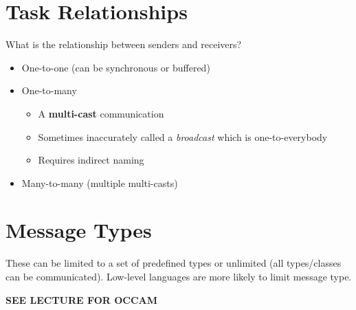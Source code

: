 \documentclass[11pt]{article}
\begin{document}
\section{Task Relationships}
\label{sec:org38d6cf7}
What is the relationship between senders and receivers?
\begin{itemize}
\item One-to-one (can be synchronous or buffered)
\item One-to-many
\begin{itemize}
\item A \textbf{multi-cast} communication
\item Sometimes inaccurately called a \emph{broadcast} which is one-to-everybody
\item Requires indirect naming
\end{itemize}
\item Many-to-many (multiple multi-casts)
\end{itemize}

\section{Message Types}
\label{sec:org3c20629}
These can be limited to a set of predefined types or unlimited (all types/classes can be communicated).
Low-level languages are more likely to limit message type.

\textbf{SEE LECTURE FOR OCCAM}
\end{document}
